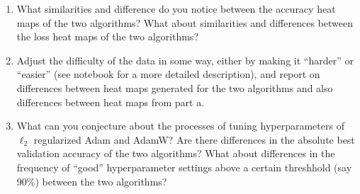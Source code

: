 \begin{enumerate}[(a)]
{\begin{enumerate}
    \item What similarities and difference do you notice between the accuracy heat maps of the two algorithms? What about similarities and differences between the loss heat maps of the two algorithms?
    \item Adjust the difficulty of the data in some way, either by making it ``harder'' or ``easier'' (see notebook for a more detailed description), and report on differences between heat maps generated for the two algorithms and also differences between heat maps from part a. 
    \item What can you conjecture about the processes of tuning hyperparameters of $\ell_2$ regularized Adam and AdamW? Are there differences in the absolute best validation accuracy of the two algorithms? What about differences in the frequency of ``good'' hyperparameter settings above a certain threshhold (say $90\%$) between the two algorithms?  
\end{enumerate}
}

        


\end{enumerate}
